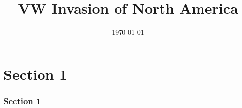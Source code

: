 \documentclass{beamer}
\title[Managerial Economics]{VW Invasion of North America} %
\institute[FDSM] %
{
\textit{Fudan Business} \\\textit{School of Management} \\ %
\medskip
}
\date{\today} %
\begin{document}
\section{Section 1}
\begin{frame}
\frametitle{Section 1}
\end{frame}
\end{document}
